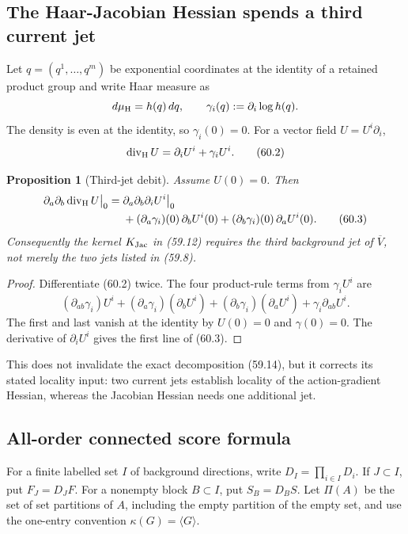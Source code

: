 \documentclass[11pt,oneside]{book}
\newtheorem{proposition}[theorem]{Proposition}
\theoremstyle{definition}
\theoremstyle{remark}
\begin{document}
\subsection{The Haar-Jacobian Hessian spends a third current jet}

Let \(q=(q^1,\ldots,q^m)\) be exponential coordinates at the identity
of a retained product group and write Haar measure as
\[
 d\mu_{\rm H}=h(q)\,dq,\qquad
 \gamma_i(q):=\partial_i\log h(q).
\]
The density is even at the identity, so \(\gamma_i(0)=0\).  For a
vector field \(U=U^i\partial_i\),
\[
 \operatorname{div}_{\rm H}U
 =\partial_iU^i+\gamma_iU^i.                                  \tag{60.2}
\]

\begin{proposition}[Third-jet debit]
\label{prop:e8v60-third-jet-debit}
Assume \(U(0)=0\).  Then
\[
\begin{split}
 \partial_a\partial_b\operatorname{div}_{\rm H}U\big|_0
 ={}&\partial_a\partial_b\partial_iU^i\big|_0\\
 &+(\partial_a\gamma_i)(0)\,\partial_bU^i(0)
  +(\partial_b\gamma_i)(0)\,\partial_aU^i(0).                \tag{60.3}
\end{split}
\]
Consequently the kernel \(K_{\rm Jac}\) in (59.12) requires the
third background jet of \(\overline V\), not merely the two jets
listed in (59.8).
\end{proposition}

\begin{proof}
Differentiate (60.2) twice.  The four product-rule terms from
\(\gamma_iU^i\) are
\[
 (\partial_{ab}\gamma_i)U^i
 +(\partial_a\gamma_i)(\partial_bU^i)
 +(\partial_b\gamma_i)(\partial_aU^i)
 +\gamma_i\partial_{ab}U^i.
\]
The first and last vanish at the identity by \(U(0)=0\) and
\(\gamma(0)=0\).  The derivative of \(\partial_iU^i\) gives the
first line of (60.3).
\end{proof}

This does not invalidate the exact decomposition (59.14), but it
corrects its stated locality input: two current jets establish
locality of the action-gradient Hessian, whereas the Jacobian
Hessian needs one additional jet.

\subsection{All-order connected score formula}

For a finite labelled set \(I\) of background directions, write
\(D_I=\prod_{i\in I}D_i\).  If \(J\subset I\), put
\(F_J=D_JF\).  For a nonempty block \(B\subset I\), put
\(S_B=D_BS\).  Let \(\Pi(A)\) be the set of set partitions of
\(A\), including the empty partition of the empty set, and use the
one-entry convention \(\kappa(G)=\langle G\rangle\).
\end{document}
